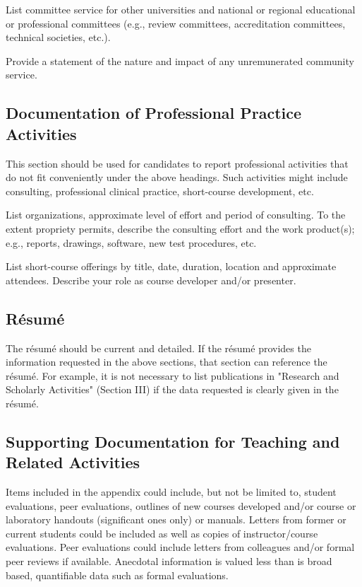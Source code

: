 List committee service for other universities and national or regional educational or professional committees (e.g., review committees, accreditation committees, technical societies, etc.).

Provide a statement of the nature and impact of any unremunerated community service.

\subsection*{Documentation of Professional Practice Activities}
This section should be used for candidates to report professional activities that do not fit conveniently under the above headings. Such activities might include consulting, professional clinical practice, short-course development, etc.

List organizations, approximate level of effort and period of consulting. To the extent propriety permits, describe the consulting effort and the work product(s); e.g., reports, drawings, software, new test procedures, etc.

List short-course offerings by title, date, duration, location and approximate attendees. Describe your role as course developer and/or presenter.

\subsection*{Résumé}
The résumé should be current and detailed. If the résumé provides the information requested in the above sections, that section can reference the résumé. For example, it is not necessary to list publications in "Research and Scholarly Activities" (Section III) if the data requested is clearly given in the résumé. 

\subsection*{Supporting Documentation for Teaching and Related Activities}
Items included in the appendix could include, but not be limited to, student evaluations, peer evaluations, outlines of new courses developed and/or course or laboratory handouts (significant ones only) or manuals. Letters from former or current students could be included as well as copies of instructor/course evaluations. Peer evaluations could include letters from colleagues and/or formal peer reviews if available. Anecdotal information is valued less than is broad based, quantifiable data such as formal evaluations.

